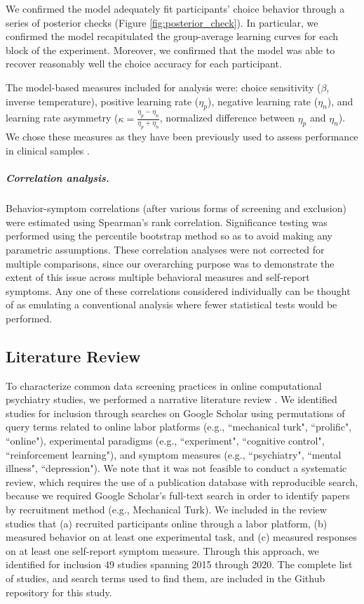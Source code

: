 \documentclass[a4paper,notitlepage,12pt]{article}
\begin{document}
\begin{refsection}[main]
We confirmed the model adequately fit participants' choice behavior through a series of posterior checks (Figure \ref{fig:posterior_check}). In particular, we confirmed the model recapitulated the group-average learning curves for each block of the experiment. Moreover, we confirmed that the model was able to recover reasonably well the choice accuracy for each participant.

The model-based measures included for analysis were: choice sensitivity ($\beta$,  inverse temperature), positive learning rate ($\eta_p$), negative learning rate ($\eta_n$), and learning rate asymmetry ($\kappa = \frac{\eta_p-\eta_n}{\eta_p+\eta_n}$, normalized difference between $\eta_p$ and $\eta_n$). We chose these measures as they have been previously used to assess performance in clinical samples \cite{huang2017computational, brolsma2020challenging, mukherjee_reward_2020, ritschel2017neural}. 

\subparagraph{Correlation analysis.} Behavior-symptom correlations (after various forms of screening and exclusion) were estimated using Spearman's rank correlation. Significance testing was performed using the percentile bootstrap method \cite{wilcox2018guide} so as to avoid making any parametric assumptions. These correlation analyses were not corrected for multiple comparisons, since our overarching purpose was to demonstrate the extent of this issue across multiple behavioral measures and self-report symptoms. Any one of these correlations considered individually can be thought of as emulating a conventional analysis where fewer statistical tests would be performed.

\subsection*{Literature Review}

To characterize common data screening practices in online computational psychiatry studies, we performed a narrative literature review \cite{grant2009typology}. We identified studies for inclusion through searches on Google Scholar using permutations of query terms related to online labor platforms (e.g., ``mechanical turk", ``prolific", ``online"), experimental paradigms (e.g., ``experiment", ``cognitive control", ``reinforcement learning"), and symptom measures (e.g., ``psychiatry", ``mental illness", ``depression"). We note that it was not feasible to conduct a systematic review, which requires the use of a publication database with reproducible search, because we required Google Scholar's full-text search in order to identify papers by recruitment method (e.g., Mechanical Turk). We included in the review studies that (a) recruited participants online through a labor platform, (b) measured behavior on at least one experimental task, and (c) measured responses on at least one self-report symptom measure. Through this approach, we identified for inclusion 49 studies spanning 2015 through 2020. The complete list of studies, and search terms used to find them, are included in the Github repository for this study.


\end{refsection}
\end{document}
